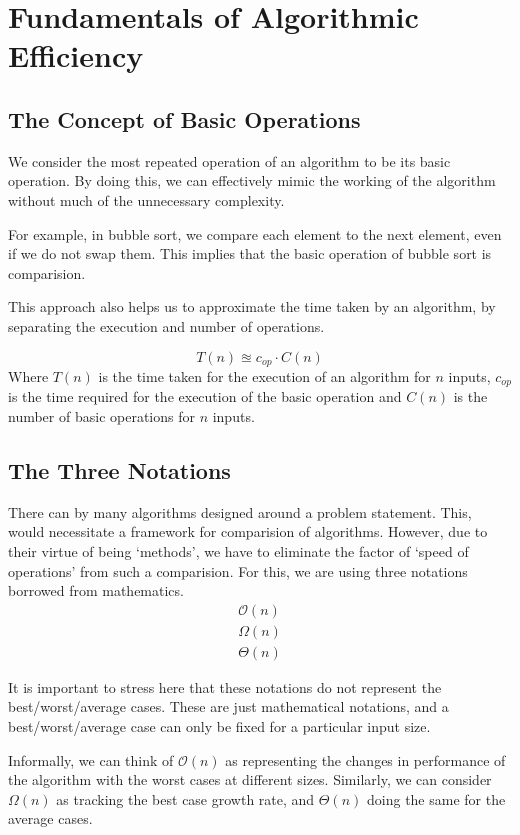 \chapter{Fundamentals of Algorithmic Efficiency}

\section{The Concept of Basic Operations}
We consider the most repeated operation of an algorithm to be its basic operation. By doing this, we can effectively mimic the working of the algorithm without much of the unnecessary complexity. 

For example, in bubble sort, we compare each element to the next element, even if we do not swap them. This implies that the basic operation of bubble sort is comparision.

This approach also helps us to approximate the time taken by an algorithm, by separating the execution and number of operations.

\[
    T(n) \approxeq c_{op} \cdot C(n)
\]
Where \mbox{\(T(n)\)} is the time taken for the execution of an algorithm for \mbox{\(n\)} inputs, \mbox{\(c_{op}\)} is the time required for the execution of the basic operation and \mbox{\(C(n)\)} is the number of basic operations for \mbox{\(n\)} inputs.

\section{The Three Notations}
There can by many algorithms designed around a problem statement. This, would necessitate a framework for comparision of algorithms. However, due to their virtue of being `methods', we have to eliminate the factor of `speed of operations' from such a comparision. For this, we are using three notations borrowed from mathematics.
\begin{gather*}
    \mathcal{O}\left( n \right)  \tag{Upper Bound}\\
    \Omega \left( n \right) \tag{Lower Bound}\\
    \Theta \left( n \right) \tag{Tight Bound}
\end{gather*}

It is important to stress here that these notations do not represent the best/worst/average cases. These are just mathematical notations, and a best/worst/average case can only be fixed for a particular input size.

Informally, we can think of \mbox{\(\mathcal{O}(n)\)} as representing the changes in performance of the algorithm with the worst cases at different sizes. Similarly, we can consider \mbox{\( \Omega \left( n \right)\)} as tracking the best case growth rate, and \mbox{\(\Theta \left( n \right)\)} doing the same for the average cases.



